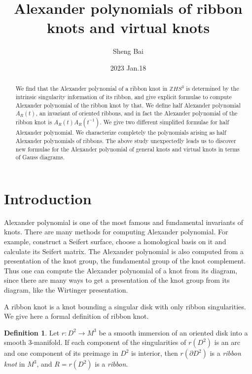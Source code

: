 \documentclass{amsart}
\theoremstyle{definition}
\newtheorem{defn}[thm]{Definition}
\theoremstyle{remark}
\numberwithin{equation}{subsection}
\begin{document}
\title[Alexander polynomials of ribbon knots and virtual knots]
{ Alexander polynomials of ribbon knots and virtual knots }

\author{Sheng Bai}
\address{  }



\begin{abstract}
We find that the Alexander polynomial of a ribbon knot in $ \mathbb{Z}HS^3 $ is determined by the intrinsic singularity information of its ribbon, and give explicit formulae to compute Alexander polynomial of the ribbon knot by that. We define half Alexander polynomial $  A_R (t) $, an invariant of oriented ribbons, and in fact the Alexander polynomial of the ribbon knot is $ A_R (t)  A_R (t^{-1}) $. We give two different simplified formulae for half Alexander polynomial. We characterize completely the polynomials arising as half Alexander polynomials of ribbons. 
The above study unexpectedly leads us to discover new formulae for the Alexander polynomial of general knots and virtual knots in terms of Gauss diagrams.
\end{abstract}

\date{2023 Jan.18}
\maketitle

\tableofcontents

\section{Introduction}
Alexander polynomial is one of the most famous and fundamental invariants of knots. There are many methods for computing Alexander polynomial. For example, construct a Seifert surface, choose a homological basis on it and calculate its Seifert matrix. The Alexander polynomial is also computed from a presentation of the knot group, the fundamental group of the knot complement. Thus one can compute the Alexander polynomial of a knot from its diagram, since there are many ways to get a presentation of the knot group from its diagram, like the Wirtinger presentation.

A ribbon knot is a knot bounding a singular disk with only ribbon singularities. We give here a formal definition of ribbon knot.
\begin{defn}\label{def:ribbon}
Let $r: D^2 \longrightarrow M^3$ be a smooth immersion of an oriented disk into a smooth 3-manifold. If each component of the singularities of $r(D^2)$ is an arc and one component of its preimage in $D^2$ is interior, then $r (\partial D^2 )$ is a \emph{ribbon knot} in $ M^3 $, and $ R = r(D^2)$ is a \emph{ribbon}.
\end{defn}
\end{document}
